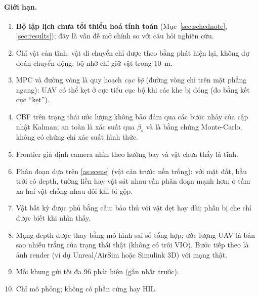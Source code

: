 \documentclass[11pt,a4paper]{article}
\numberwithin{equation}{section}
\theoremstyle{definition}
\theoremstyle{plain}
\theoremstyle{remark}
\begin{document}
\paragraph{Giới hạn.}
\begin{enumerate}[label=(\roman*)]
\item \textbf{Bộ lập lịch chưa tối thiểu hoá tính toán} (Mục~\ref{sec:schednote}, \ref{sec:results}); đây là vấn đề mở chính so với câu hỏi nghiên cứu.
\item Chỉ vật cản tĩnh: vật di chuyển chỉ được theo bằng phát hiện lại, không dự đoán chuyển động; bộ nhớ chỉ giữ vật trong 10~m.
\item MPC và đường vòng là quy hoạch \emph{cục bộ} (đường vòng chỉ trên mặt phẳng ngang): UAV có thể kẹt ở cực tiểu cục bộ khi các khe bị đóng (đo bằng kết cục ``kẹt'').
\item CBF trên trạng thái ước lượng không bảo đảm qua các bước nhảy của cập nhật Kalman; an toàn là xác suất qua $\beta_s$ và là bằng chứng Monte-Carlo, không có chứng chỉ xác suất hình thức.
\item Frontier giả định camera nhìn theo hướng bay và vật chưa thấy là tĩnh.
\item Phân đoạn dựa trên \ref{as:scene} (vật cản trước nền trống): với mặt đất, bầu trời có depth, tường liền hay vật sát nhau cần phân đoạn mạnh hơn; ở tầm xa hai vật chồng nhau đôi khi bị gộp.
\item Vật bất kỳ được phủ bằng cầu: bảo thủ với vật dẹt hay dài; phần bị che chỉ được biết khi nhìn thấy.
\item Mạng depth được thay bằng mô hình sai số tổng hợp; ước lượng UAV là bản sao nhiễu trắng của trạng thái thật (không có trôi VIO). Bước tiếp theo là ảnh render (ví dụ Unreal/AirSim hoặc Simulink 3D) với mạng thật.
\item Mỗi khung gửi tối đa 96 phát hiện (gần nhất trước).
\item Chỉ mô phỏng; không có phần cứng hay HIL.
\end{enumerate}

\end{document}
